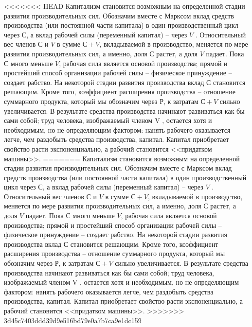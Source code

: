 \documentclass{book}
\begin{document}
<<<<<<< HEAD
Капитализм становится возможным на определенной ста­дии развития производительных сил. Обозначим вместе с Марк­сом вклад средств производства (или постоянной части капи­тала) в один производственный цикл через $С$, а вклад рабочей силы (переменный капитал) -- через $V$ . Относительный вес членов $С$ и $V$ в сумме $С + V$, вкладываемой в производство, меняется по мере развития производительных сил, а именно, доля $С$ растет, а доля $V$ падает. Пока $С$ много меньше $V$, рабо­чая сила является основой производства; прямой и простейший способ организации рабочей силы -- физическое принуждение -- создает рабство. На некоторой стадии развития производства вклад $С$ становится решающим. Кроме того, коэффициент расширения производства -- отношение суммарного продукта, который мы обозначим через $Р$, к затратам $С + V$ сильно уве­личивается. В результате средства производства начинают раз­виваться как бы сами собой; труд человека, изображаемый членом V , остается хотя и необходимым, но не определяющим фактором: нанять рабочего оказывается легче, чем раздобыть средства производства, капитал. Капитал приобретает свойст­во расти экспоненциально, а рабочий становится <<придатком машины>>.
=======
Капитализм становится возможным на определенной ста­дии развития производительных сил. Обозначим вместе с Марк­сом вклад средств производства (или постоянной части капи­тала) в один производственный цикл через $С$, а вклад рабочей силы (переменный капитал) -- через $V$ . Относительный вес членов $С$ и $V$ в сумме $С + V$, вкладываемой в производство, меняется по мере развития производительных сил, а именно, доля $С$ растет, а доля $V$ падает. Пока $С$ много меньше $V$, рабо­чая сила является основой производства; прямой и простейший способ организации рабочей силы -- физическое принуждение -- создает рабство. На некоторой стадии развития производства вклад $С$ становится решающим. Кроме того, коэффициент расширения производства -- отношение суммарного продукта, который мы обозначим через $Р$, к затратам $С + V$ сильно уве­личивается. В результате средства производства начинают раз­виваться как бы сами собой; труд человека, изображаемый членом V , остается хотя и необходимым, но не определяющим фактором: 
нанять рабочего оказывается легче, чем раздобыть средства производства, капитал. Капитал приобретает свойст­во расти экспоненциально, а рабочий становится <<придатком машины>>.
>>>>>>> 3d45c7403ddd39d9e516bd79e0a7b7ca9e1dc159
\end{document}

